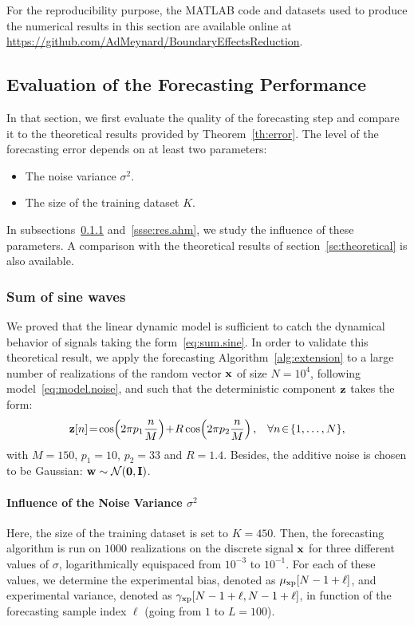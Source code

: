 For the reproducibility purpose, the MATLAB code and datasets used to produce the numerical results in this section are available online at \url{https://github.com/AdMeynard/BoundaryEffectsReduction}.

\subsection{Evaluation of the Forecasting Performance}
In that section, we first evaluate the quality of the forecasting step and compare it to the theoretical results provided by Theorem~\ref{th:error}. The level of the forecasting error depends on at least two parameters:
\begin{itemize}
\item The noise variance $\sigma^2$.
\item The size of the training dataset $K$. 
\end{itemize}
In subsections~\ref{ssse:res.sine} and~\ref{ssse:res.ahm}, we study the influence of these parameters. A comparison with the theoretical results of section~\ref{se:theoretical} is also available.

\subsubsection{Sum of sine waves}
\label{ssse:res.sine}
We proved that the linear dynamic model is sufficient to catch the dynamical behavior of signals taking the form~\eqref{eq:sum.sine}. In order to validate this theoretical result, we apply the forecasting Algorithm~\ref{alg:extension} to a large number of realizations of the random vector ${\mathbf x}$ of size $N=10^4$, following model~\eqref{eq:model.noise}, and such that the deterministic component ${\mathbf z}$ takes the form:
\[
\bz[n]\! =\!\cos\!\left(2\pi p_1 \dfrac{n}{M} \right)\! +\! R\cos\!\left(2\pi p_2 \dfrac{n}{M} \right),\quad \!\forall n\!\in\!\{1,\ldots,N\},
\]
with $M=150$, $p_1=10$, $p_2=33$ and $R=1.4$. Besides, the additive noise is chosen to be Gaussian: ${\mathbf w}\sim{\mathcal N}(\boldsymbol{0},{\mathbf I})$.

\paragraph{Influence of the Noise Variance $\sigma^2$} Here, the size of the training dataset is set to $K=450$. Then, the forecasting algorithm is run on $1000$ realizations on the discrete signal ${\mathbf x}$ for three different values of $\sigma$, logarithmically equispaced from $10^{-3}$ to $10^{-1}$. For each of these values, we determine the experimental bias, denoted as $\mu_{{\mathrm{xp}}}[N-1+\ell]$, and experimental variance, denoted as $\gamma_{{\mathrm{xp}}}[N-1+\ell,N-1+\ell]$, in function of the forecasting sample index $\ell$ (going from $1$ to $L=100$).

